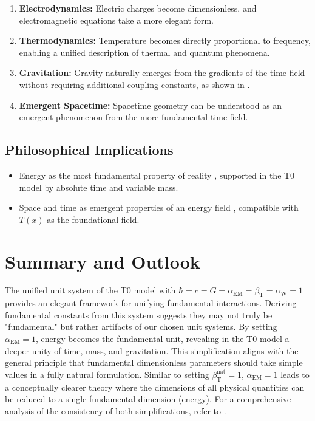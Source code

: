 \documentclass[12pt,a4paper]{article}
\newcommand{\Tfield}{T(x)}
\newcommand{\betaT}{\beta_{\text{T}}}
\newcommand{\alphaEM}{\alpha_{\text{EM}}}
\newcommand{\alphaW}{\alpha_{\text{W}}}
\begin{document}
	\begin{enumerate}
		\item \textbf{Electrodynamics:} Electric charges become dimensionless, and electromagnetic equations take a more elegant form.
		\item \textbf{Thermodynamics:} Temperature becomes directly proportional to frequency, enabling a unified description of thermal and quantum phenomena.
		\item \textbf{Gravitation:} Gravity naturally emerges from the gradients of the time field without requiring additional coupling constants, as shown in \cite{pascher_emergente_gravitation_2025}.
		\item \textbf{Emergent Spacetime:} Spacetime geometry can be understood as an emergent phenomenon from the more fundamental time field.
	\end{enumerate}
	
	\subsection{Philosophical Implications}
	\label{subsec:philosophical}
	
	\begin{itemize}
		\item Energy as the most fundamental property of reality \cite{Wilczek2008}, supported in the T0 model by absolute time and variable mass.
		\item Space and time as emergent properties of an energy field \cite{Verlinde2011}, compatible with \(\Tfield\) as the foundational field.
	\end{itemize}
	
	\section{Summary and Outlook}
	\label{sec:summary}
	
	The unified unit system of the T0 model with \(\hbar = c = G = \alphaEM = \betaT = \alphaW = 1\) provides an elegant framework for unifying fundamental interactions. Deriving fundamental constants from this system suggests they may not truly be "fundamental" but rather artifacts of our chosen unit systems. By setting \(\alphaEM = 1\), energy becomes the fundamental unit, revealing in the T0 model a deeper unity of time, mass, and gravitation. This simplification aligns with the general principle that fundamental dimensionless parameters should take simple values in a fully natural formulation. Similar to setting \(\betaT^{\text{nat}} = 1\), \(\alphaEM = 1\) leads to a conceptually clearer theory where the dimensions of all physical quantities can be reduced to a single fundamental dimension (energy). For a comprehensive analysis of the consistency of both simplifications, refer to \cite{pascher_alphabeta_2025}.
	
\end{document}
